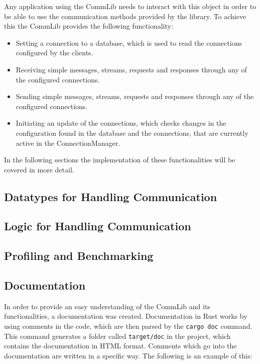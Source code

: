 Any application using the CommLib needs to interact with this object in order to be able to use the communication methods provided by the library. 
To achieve this the CommLib provides the following functionality:

\begin{itemize}
	\item Setting a connection to a database, which is used to read the connections configured by the clients.
	\item Receiving simple messages, streams, requests and responses through any of the configured connections.
	\item Sending simple messages, streams, requests and responses through any of the configured connections.
	\item Initiating an update of the connections, which checks changes in the configuration found in the database and the connections, that are currently active in the ConnectionManager.
\end{itemize}

In the following sections the implementation of these functionalities will be covered in more detail.

\subsection{Datatypes for Handling Communication}


\subsection{Logic for Handling Communication}

\subsection{Profiling and Benchmarking}

\subsection{Documentation}
In order to provide an easy understanding of the CommLib and its functionalities, a documentation was created.
Documentation in Rust works by using comments in the code, which are then parsed by the \verb+cargo doc+ command. 
This command generates a folder called \verb+target/doc+ in the project, which contains the documentation in HTML format.
Comments which go into the documentation are written in a specific way.
The following is an example of this: 

